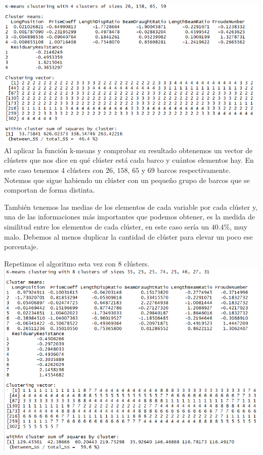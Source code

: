 \documentclass[twoside]{article}
\begin{document}
\begin{multicols}{2}
\includegraphics[scale=0.3]{images/pic_32.png} \\

Al aplicar la funci\'on k-means y comprobar su resultado obtenemos un vector de cl\'usters que nos dice en qu\'e clúster est\'a cada barco y cu\'antos elementos hay. En este caso tenemos $4$ cl\'usters con $26$, $158$, $65$ y $69$ barcos respectivamente. Notemos que sigue habiendo un cl\'uster con un peque\~no grupo de barcos que se comportan de forma distinta.

Tambi\'en tenemos las medias de los elementos de cada variable por cada cl\'uster y, una de las informaciones m\'as importantes que podemos obtener, es la medida de similitud entre los elementos de cada cl\'uster, en este caso ser\'ia un $40.4\%$, muy malo. Debemos al menos duplicar la cantidad de cl\'uster para elevar un poco ese porcentaje.

Repetimos el algoritmo esta vez con $8$ cl\'usters.\\

\includegraphics[scale=0.3]{images/pic_33.png} \\


\end{multicols}
\end{document}

